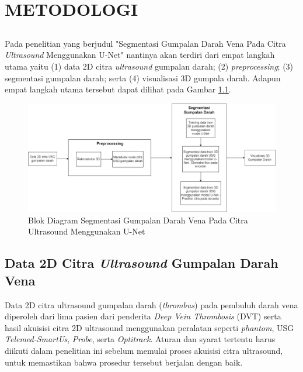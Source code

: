 

\chapter{METODOLOGI}
\label{sec:chap3_metodologi}



\section*{ }
Pada penelitian yang berjudul "Segmentasi Gumpalan Darah Vena Pada Citra \textit{Ultrasound} Menggunakan U-Net" nantinya akan terdiri dari empat langkah utama yaitu (1) data 2D citra \textit{ultrasound} gumpalan darah; (2) \textit{preprocessing}; (3) segmentasi gumpalan darah; serta (4) visualisasi 3D gumpala darah. Adapun empat langkah utama tersebut dapat dilihat pada Gambar \ref{fig:blokdiagram}.
\begin{figure}[H]
	\centering
	\includegraphics[width=\linewidth]{bab3/diagram-block version 2.png}
	\caption{Blok Diagram Segmentasi Gumpalan Darah Vena Pada Citra Ultrasound Menggunakan U-Net}
	\label{fig:blokdiagram}
\end{figure}


\section{Data 2D Citra \textit{Ultrasound} Gumpalan Darah Vena}

Data 2D citra ultrasound gumpalan darah (\textit{thrombus}) pada pembuluh darah vena diperoleh dari lima pasien dari penderita \textit{Deep Vein Thrombosis} (DVT) serta hasil akuisisi citra 2D ultrasound menggunakan peralatan seperti \textit{phantom}, USG \textit{Telemed-SmartUs}, \textit{Probe}, serta \textit{Optitrack}. Aturan dan syarat tertentu harus diikuti dalam penelitian ini sebelum memulai proses akuisisi citra ultrasound, untuk memastikan bahwa prosedur tersebut berjalan dengan baik. 

